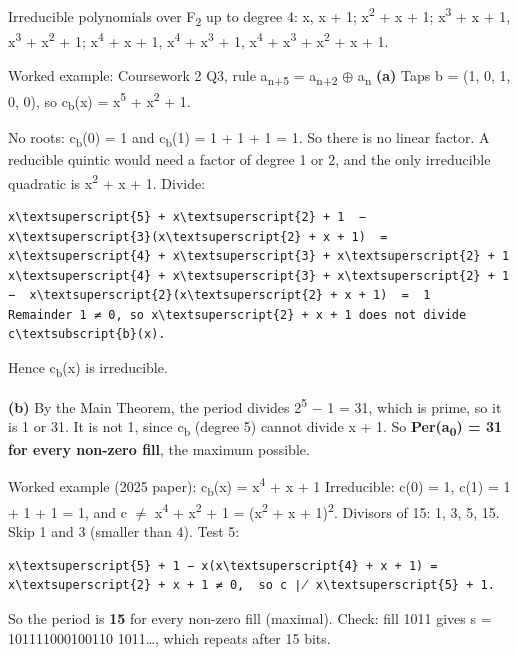 \documentclass[11pt,a4paper]{article}
\begin{document}
{\small\color{black!70} Irreducible polynomials over F\textsubscript{2} up to degree 4: x, x + 1; x\textsuperscript{2} + x + 1; x\textsuperscript{3} + x + 1, x\textsuperscript{3} + x\textsuperscript{2} + 1; x\textsuperscript{4} + x + 1, x\textsuperscript{4} + x\textsuperscript{3} + 1, x\textsuperscript{4} + x\textsuperscript{3} + x\textsuperscript{2} + x + 1.}\par
\begin{example}{Worked example: Coursework 2 Q3, rule a\textsubscript{n+5} = a\textsubscript{n+2} \ensuremath{\oplus} a\textsubscript{n}}
\textbf{(a)} Taps b = (1, 0, 1, 0, 0), so c\textsubscript{b}(x) = x\textsuperscript{5} + x\textsuperscript{2} + 1.\par
No roots: c\textsubscript{b}(0) = 1 and c\textsubscript{b}(1) = 1 + 1 + 1 = 1. So there is no linear factor. A reducible quintic would need a factor of degree 1 or 2, and the only irreducible quadratic is x\textsuperscript{2} + x + 1. Divide:\par
\begin{workbox}
\begin{Verbatim}[commandchars=\\\{\},fontsize=\footnotesize]
x\textsuperscript{5} + x\textsuperscript{2} + 1  −  x\textsuperscript{3}(x\textsuperscript{2} + x + 1)  =  x\textsuperscript{4} + x\textsuperscript{3} + x\textsuperscript{2} + 1
x\textsuperscript{4} + x\textsuperscript{3} + x\textsuperscript{2} + 1  −  x\textsuperscript{2}(x\textsuperscript{2} + x + 1)  =  1
Remainder 1 ≠ 0, so x\textsuperscript{2} + x + 1 does not divide c\textsubscript{b}(x).
\end{Verbatim}
\end{workbox}
Hence c\textsubscript{b}(x) is irreducible.\par
\textbf{(b)} By the Main Theorem, the period divides 2\textsuperscript{5} \ensuremath{-} 1 = 31, which is prime, so it is 1 or 31. It is not 1, since c\textsubscript{b} (degree 5) cannot divide x + 1. So \textbf{Per(a\textsubscript{0}) = 31 for every non-zero fill}, the maximum possible.\par
\end{example}
\begin{example}{Worked example (2025 paper): c\textsubscript{b}(x) = x\textsuperscript{4} + x + 1}
Irreducible: c(0) = 1, c(1) = 1 + 1 + 1 = 1, and c \ensuremath{\neq} x\textsuperscript{4} + x\textsuperscript{2} + 1 = (x\textsuperscript{2} + x + 1)\textsuperscript{2}. Divisors of 15: 1, 3, 5, 15. Skip 1 and 3 (smaller than 4). Test 5:\par
\begin{workbox}
\begin{Verbatim}[commandchars=\\\{\},fontsize=\footnotesize]
x\textsuperscript{5} + 1 − x(x\textsuperscript{4} + x + 1) = x\textsuperscript{2} + x + 1 ≠ 0,  so c ∤ x\textsuperscript{5} + 1.
\end{Verbatim}
\end{workbox}
So the period is \textbf{15} for every non-zero fill (maximal). Check: fill 1011 gives s = 101111000100110 1011\ldots{}, which repeats after 15 bits.\par
\end{example}
\end{document}
